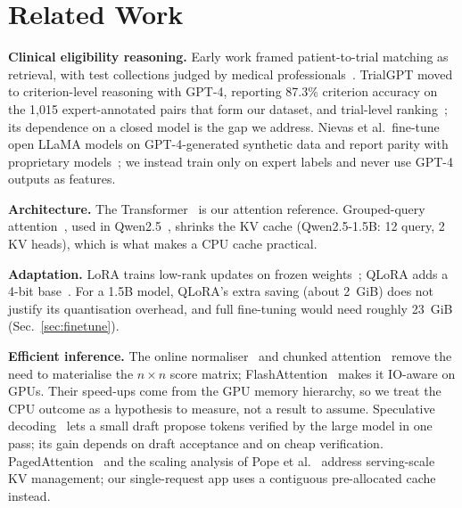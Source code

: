 \section{Related Work}
\label{sec:related}
\textbf{Clinical eligibility reasoning.} Early work framed patient-to-trial matching as retrieval, with test collections judged by medical professionals~\cite{koopman2016test}. TrialGPT moved to criterion-level reasoning with GPT-4, reporting 87.3\% criterion accuracy on the 1{,}015 expert-annotated pairs that form our dataset, and trial-level ranking~\cite{jin2024trialgpt}; its dependence on a closed model is the gap we address. Nievas et al.\ fine-tune open LLaMA models on GPT-4-generated synthetic data and report parity with proprietary models~\cite{nievas2023distilling}; we instead train only on expert labels and never use GPT-4 outputs as features.

\textbf{Architecture.} The Transformer~\cite{vaswani2017attention} is our attention reference. Grouped-query attention~\cite{ainslie2023gqa}, used in Qwen2.5~\cite{qwen2024qwen25}, shrinks the KV cache (Qwen2.5-1.5B: 12 query, 2 KV heads), which is what makes a CPU cache practical.

\textbf{Adaptation.} LoRA trains low-rank updates on frozen weights~\cite{hu2022lora}; QLoRA adds a 4-bit base~\cite{dettmers2023qlora}. For a 1.5B model, QLoRA's extra saving (about 2~GiB) does not justify its quantisation overhead, and full fine-tuning would need roughly 23~GiB (Sec.~\ref{sec:finetune}).

\textbf{Efficient inference.} The online normaliser~\cite{milakov2018online} and chunked attention~\cite{rabe2021selfattention} remove the need to materialise the $n\times n$ score matrix; FlashAttention~\cite{dao2022flashattention,dao2024flashattention2} makes it IO-aware on GPUs. Their speed-ups come from the GPU memory hierarchy, so we treat the CPU outcome as a hypothesis to measure, not a result to assume. Speculative decoding~\cite{leviathan2023speculative,chen2023speculative} lets a small draft propose tokens verified by the large model in one pass; its gain depends on draft acceptance and on cheap verification. PagedAttention~\cite{kwon2023pagedattention} and the scaling analysis of Pope et al.~\cite{pope2023scaling} address serving-scale KV management; our single-request app uses a contiguous pre-allocated cache instead.
